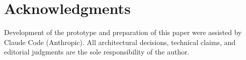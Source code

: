 \documentclass[conference,10pt]{IEEEtran}
\begin{document}
\section*{Acknowledgments}

Development of the prototype and preparation of this paper were assisted by Claude Code (Anthropic). All architectural decisions, technical claims, and editorial judgments are the sole responsibility of the author.


\end{document}
